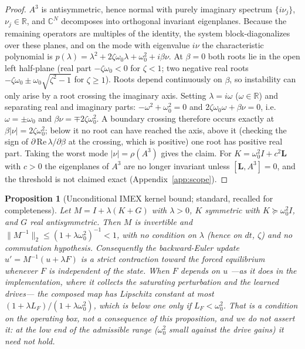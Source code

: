 \documentclass{article}
\newtheorem{proposition}{Proposition}
\begin{document}
{\begin{proof}
$A^3$ is antisymmetric, hence normal with purely imaginary spectrum
$\{i\nu_j\}$, $\nu_j\in\mathbb{R}$, and $\mathbb{C}^N$ decomposes into
orthogonal invariant eigenplanes. Because the remaining operators are
multiples of the identity, the system block-diagonalizes over these
planes, and on the mode with eigenvalue $i\nu$ the characteristic
polynomial is
$p(\lambda)=\lambda^2 + 2\zeta\omega_0\lambda + \omega_0^2 + i\beta\nu$.
At $\beta=0$ both roots lie in the open left half-plane (real part
$-\zeta\omega_0<0$ for $\zeta<1$; two negative real roots
$-\zeta\omega_0\pm\omega_0\sqrt{\zeta^2-1}$ for $\zeta\ge1$). Roots depend
continuously on $\beta$, so instability can only arise by a root
crossing the imaginary axis. Setting $\lambda=i\omega$
($\omega\in\mathbb{R}$) and separating real and imaginary parts:
$-\omega^2+\omega_0^2=0$ and $2\zeta\omega_0\omega + \beta\nu = 0$,
i.e.\ $\omega=\pm\omega_0$ and $\beta\nu = \mp 2\zeta\omega_0^2$. A
boundary crossing therefore occurs exactly at
$\beta|\nu| = 2\zeta\omega_0^2$; below it no root can have reached the
axis, above it (checking the sign of
$\partial\,\mathrm{Re}\,\lambda/\partial\beta$ at the crossing, which is
positive) one root has positive real part. Taking the worst mode
$|\nu|=\rho(A^3)$ gives the claim. For $K=\omega_0^2I+c^2\mathbf{L}$
with $c>0$ the eigenplanes of $A^3$ are no longer invariant unless
$[\mathbf{L},A^3]=0$, and the threshold is not claimed exact
(Appendix~\ref{app:scope}).
\end{proof}

\begin{proposition}[Unconditional IMEX kernel bound; standard, recalled for
completeness]\label{prop:imex-proof}
Let $M = I + \lambda(K+G)$ with $\lambda>0$, $K$ symmetric with
$K\succeq\omega_0^2 I$, and $G$ real antisymmetric. Then $M$ is
invertible and $\|M^{-1}\|_2 \le (1+\lambda\omega_0^2)^{-1} < 1$,
with no condition on $\lambda$ (hence on $dt$, $\zeta$) and no
commutation hypothesis. Consequently the backward-Euler update
$u' = M^{-1}(u+\lambda F)$ is a strict contraction toward the forced
equilibrium whenever $F$ is \emph{independent of the state}. When $F$
depends on $u$ ---as it does in the implementation, where it collects the
saturating perturbation and the learned drives--- the composed map has
Lipschitz constant at most $(1+\lambda L_F)/(1+\lambda\omega_0^2)$, which is
below one only if $L_F<\omega_0^2$. That is a condition on the operating box,
not a consequence of this proposition, and we do not assert it: at the low
end of the admissible range ($\omega_0^2$ small against the drive gains) it
need not hold.
\end{proposition}

}
\end{document}
